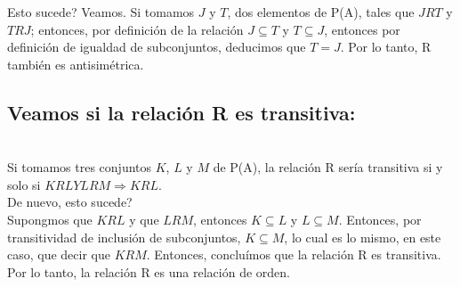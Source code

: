 \documentclass{article}
\begin{document}
Esto sucede? Veamos. Si tomamos $J$ y $T$, dos elementos de P(A), tales que $JRT$ y $TRJ$; entonces, por definición de la relación $J \subseteq T$ y $ T\subseteq J$, entonces por definición de igualdad de subconjuntos, deducimos que $T=J$. Por lo tanto, R también es antisimétrica.\\

\subsection{Veamos si la relación R es transitiva:}\\

Si tomamos tres conjuntos $K$, $L$ y $M$ de P(A), la relación R sería transitiva si y solo si $KRL Y LRM \Rightarrow KRL$. \\

De nuevo, esto sucede?\\

Supongmos que $KRL$ y que $LRM$, entonces $K \subseteq L$ y $ L \subseteq M$. Entonces, por transitividad de inclusión de subconjuntos, $K \subseteq M$, lo cual es lo mismo, en este caso, que decir que $KRM$. Entonces, concluímos que la relación R es transitiva.\\

Por lo tanto, la relación R es una relación de orden.
 
\end{document}
